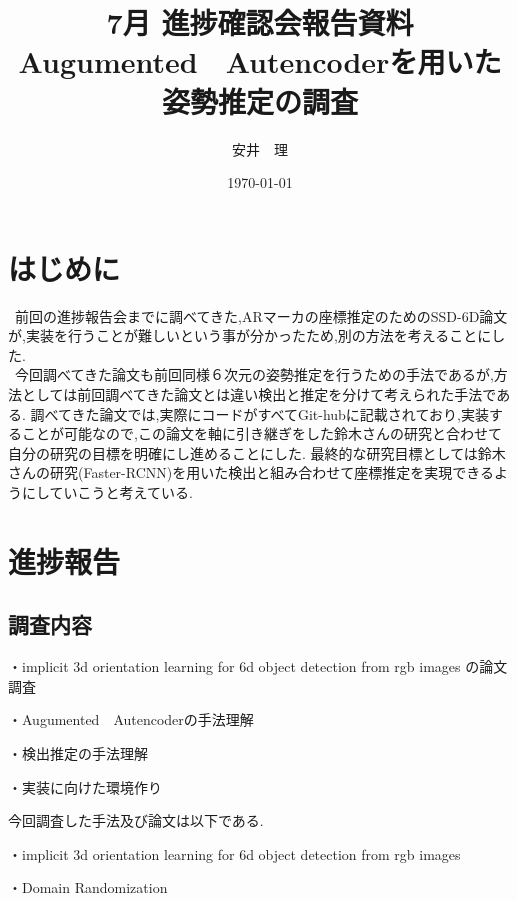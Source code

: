 \documentclass[11pt,a4j,ascmac]{jarticle}
\title{7月 進捗確認会報告資料\\
Augumented　Autencoderを用いた姿勢推定の調査}
\author{安井　理}
\date{\today}
\begin{document}
\maketitle

\section{はじめに}

\ 前回の進捗報告会までに調べてきた,ARマーカの座標推定のためのSSD-6D論文が,実装を行うことが難しいという事が分かったため,別の方法を考えることにした. \\
\ 今回調べてきた論文も前回同様６次元の姿勢推定を行うための手法であるが,方法としては前回調べてきた論文とは違い検出と推定を分けて考えられた手法である. 調べてきた論文では,実際にコードがすべてGit-hubに記載されており,実装することが可能なので,この論文を軸に引き継ぎをした鈴木さんの研究と合わせて自分の研究の目標を明確にし進めることにした. 最終的な研究目標としては鈴木さんの研究(Faster-RCNN)を用いた検出と組み合わせて座標推定を実現できるようにしていこうと考えている.



\section{進捗報告}




\subsection{調査内容}

\begin{description}
  \item  ・implicit 3d orientation learning for 6d object detection from rgb images の論文調査
　\item ・Augumented　Autencoderの手法理解
　\item ・検出推定の手法理解
　\item ・実装に向けた環境作り
\end{description}


今回調査した手法及び論文は以下である.
 
\begin{description}
    \item ・implicit 3d orientation learning for 6d object detection from rgb images　
    \item ・Domain Randomization 
\end{description}
\end{document}
